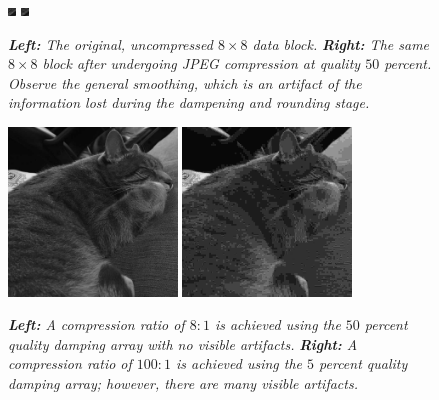 \begin{figure}

	\centering
	\includegraphics[scale=20]{chap4/figures/charles_block.png}
	\includegraphics[scale=20]{chap4/figures/charles_block_reconstructed.png}
	\caption{{\em{\bf Left:} The original, uncompressed $8\times8$ data block.} {\em{\bf Right:} The same $8 \times 8$ block after undergoing JPEG compression at quality $50$ percent. Observe the general smoothing, which is an artifact of the information lost during the dampening and rounding stage.}}
\label{fig:blockrecon}
\end{figure}

\begin{figure}[H]
	\centering
	\includegraphics[width=0.4\textwidth]{chap4/figures/charles_gray_50.jpg}
	\includegraphics[width=0.4\textwidth]{chap4/figures/charles_gray_5.jpg}
	\caption{{\em{\bf Left:} A compression ratio of $8 : 1$ is achieved using the $50$ percent quality damping array with no visible artifacts.} {\em{\bf Right:} A compression ratio of $100 : 1$ is achieved using the $5$ percent quality damping array; however, there are many visible artifacts.}}
\label{fig:comp_comparison}
\end{figure}

